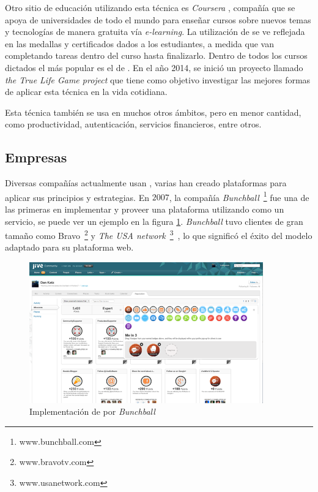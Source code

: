 Otro sitio de educación utilizando esta técnica es \emph{Coursera} \cite{Coursera},
compañía que se apoya de universidades de todo el mundo para enseñar
cursos sobre nuevos temas y tecnologías de manera gratuita vía \emph{e-learning}.
La utilización de {\gam} se ve reflejada en las medallas y certificados dados
a los estudiantes, a medida que van completando tareas dentro del curso
hasta finalizarlo.
Dentro de todos los cursos dictados el más popular es el de {\gam}\cite{Gam:Util:5}.
En el año 2014, se inició un proyecto llamado \emph{the True Life Game project}
que tiene como objetivo investigar las mejores formas de aplicar esta técnica en
la vida cotidiana.

Esta técnica también se usa en muchos otros ámbitos, pero en menor cantidad,
como productividad, autenticación, servicios financieros, entre otros.

\subsection{Empresas}

Diversas compañías actualmente usan {\gam}, varias han creado plataformas para
aplicar sus principios y estrategias.
En $2007$, la compañía \emph{Bunchball}~\footnote{www.bunchball.com} fue una de
las primeras en implementar y proveer una plataforma utilizando {\gam} como un
servicio\cite{Gam:Bunchball:1}, se puede ver un ejemplo en la figura \ref{fig:bunch}.
\emph{Bunchball} tuvo clientes de gran tamaño como Bravo~\footnote{www.bravotv.com}
y \emph{The USA network}~\footnote{www.usanetwork.com}~\cite{Gam:Bunchball:2},
lo que significó el éxito del modelo adaptado para su plataforma web.

\begin{figure}[!htb]
  \centering
  \includegraphics[width=0.9\textwidth]{images/Gam_bunch.png}
  \caption[Implementación \emph{Bunchball}]{Implementación de {\gam} por \emph{Bunchball}}
  \label{fig:bunch}
\end{figure}


